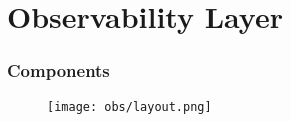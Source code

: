 \section{Observability Layer}
\begin{frame}
    \frametitle{ Components}
    \begin{figure}
        \centering
        \texttt{[image: obs/layout.png]} %
        \caption{}
    \end{figure}
\end{frame}




